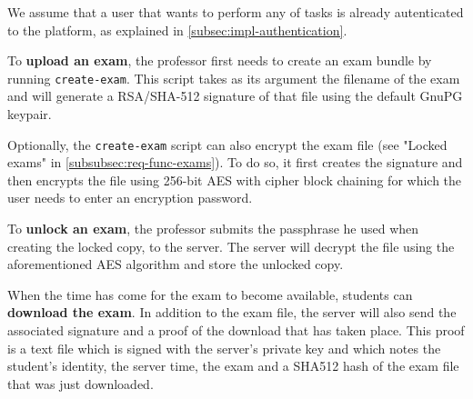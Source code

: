\documentclass[12pt]{article}
\begin{document}



We assume that a user that wants to perform any of tasks is already autenticated
to the platform, as explained in \autoref{subsec:impl-authentication}.

To \textbf{upload an exam}, the professor first needs to create an exam bundle
by running \texttt{create-exam}. This script takes as its argument the filename
of the exam and will generate a RSA/SHA-512\footnotemark{} signature of that file
using the default GnuPG keypair.


Optionally, the \texttt{create-exam} script can also encrypt the exam file (see
"Locked exams" in \autoref{subsubsec:req-func-exams}). To do so, it first
creates the signature and then encrypts the file using 256-bit AES with cipher
block chaining for which the user needs to enter an encryption password.

To \textbf{unlock an exam}, the professor submits the passphrase he used when
creating the locked copy, to the server. The server will decrypt the file using the aforementioned AES algorithm and store the unlocked copy.

When the time has come for the exam to become available, students can
\textbf{download the exam}. In addition to the exam file, the server will also
send the associated signature and a proof of the download that has taken place.
This proof is a text file which is signed with the server's private key and
which notes the student's identity, the server time, the exam and a SHA512 hash
of the exam file that was just downloaded.
\end{document}
